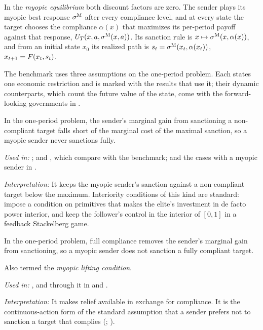 \begin{definition}
\label{def:myopic}
In the \emph{myopic equilibrium} both discount factors are zero. The sender plays
its myopic best response $\sigma^{\mathrm{M}}$ after every compliance level, and at every state
the target chooses the compliance $\alpha(x)$ that maximizes its per-period payoff
against that response, $U_T(x,a,\sigma^{\mathrm{M}}(x,a))$. Its sanction rule is
$x\mapsto\sigma^{\mathrm{M}}(x,\alpha(x))$, and from an initial state $x_0$ its realized path is
$s_t=\sigma^{\mathrm{M}}(x_t,\alpha(x_t))$, $x_{t+1}=F(x_t,s_t)$.
\end{definition}

The benchmark uses three assumptions on the one-period problem. Each states one
economic restriction and is marked with the results that use it; their dynamic
counterparts, which count the future value of the state, come with the
forward-looking governments in .

\begin{assumption}
\label{ass:stage-interiority}
In the one-period problem, the sender's marginal gain from sanctioning a
non-compliant target falls short of the marginal cost of the maximal sanction, so a
myopic sender never sanctions fully.
\end{assumption}
\noindent\textit{Used in:} ; 
and , which compare with the benchmark; and the
cases with a myopic sender in .\par
\noindent\textit{Interpretation:} It keeps the myopic sender's sanction against a
non-compliant target below the maximum. Interiority conditions of this kind are
standard: \citet[Assumption~3]{AcemogluRobinson2008} impose a condition on primitives
that makes the elite's investment in de facto power interior, and
\citet[Lemma~2.3]{BressanJiang2020} keep the follower's control in the interior of
$[0,1]$ in a feedback Stackelberg game.

\begin{assumption}
\label{ass:stage-placability}
In the one-period problem, full compliance removes the sender's marginal gain from
sanctioning, so a myopic sender does not sanction a fully compliant target.
\end{assumption}
\noindent Also termed the \emph{myopic lifting condition}.\par
\noindent\textit{Used in:} , and through it in
 and .\par
\noindent\textit{Interpretation:} It makes relief available in exchange for
compliance. It is the continuous-action form of the standard assumption that a sender
prefers not to sanction a target that complies (\citealp[Assumption~2]{Tsebelis1990};
\citealp[p.~31]{Lacy2004}).

